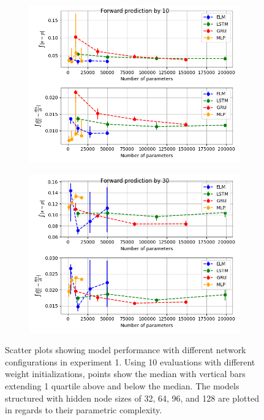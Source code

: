 \documentclass[11pt]{article}
\begin{document}
\begin{figure}
\begin{center}
\begin{subfigure}{.48\textwidth}
        \includegraphics[width=\textwidth]{figures/mg1_scatter_10.png}
        \caption{}
      \end{subfigure}
      \begin{subfigure}{.48\textwidth}
        \includegraphics[width=\textwidth]{figures/mg1_scatter_30.png}
        \caption{}
      \end{subfigure}
       
    \caption{Scatter plots showing model performance with different
      network configurations in experiment 1. Using 10 evaluations with different weight
    initializations, points show the median with vertical bars
    extending 1 quartile above and below the median. The models structured with hidden node sizes of 32, 64, 96, and 128 are plotted in regards to their parametric complexity.}
    \label{fig:mg1_scatter}
    \end{center}
  \end{figure}
  
\end{document}
